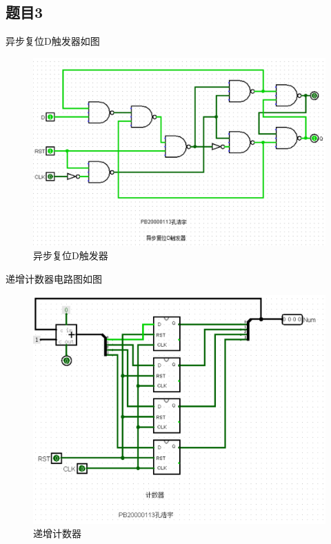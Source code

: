 \documentclass{article}
\begin{document}
    \clearpage
    \subsection*{题目3}
    异步复位D触发器如图
    \begin{figure}[htbp]
        \centering
        \includegraphics[scale=0.6]{t31.png}
        \caption*{异步复位D触发器}
    \end{figure}

    递增计数器电路图如图
    \begin{figure}[htbp]
        \centering
        \includegraphics[scale=0.6]{t32.png}
        \caption*{递增计数器}
    \end{figure}
    
\end{document}
